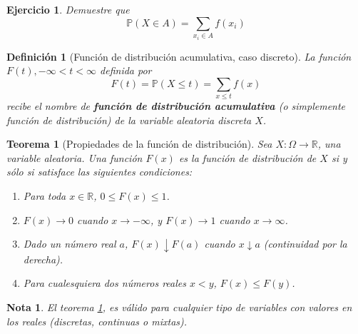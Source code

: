 \documentclass[11pt]{report}
\theoremstyle{break}
\newtheorem{definicion}{Definición}[chapter]
\newtheorem{teorema}{Teorema}[chapter]
\newtheorem{nota}{Nota}[chapter]
\newtheorem{ejercicio}{Ejercicio}[chapter]
\theoremstyle{break}
\begin{document}
\begin{ejercicio}
Demuestre que 
$$
\mathbb{P}(X \in A) = \sum_{x_i \in A}f(x_i)
$$
\end{ejercicio}

\begin{definicion}[Función de distribución acumulativa, caso discreto]
\label{definicion:funcion de distribucion caso discreto}
La función $F(t), -\infty < t < \infty$ definida por
$$
F(t) = \mathbb{P}(X \leq t) = \sum_{x \leq t} f(x)
$$
recibe el nombre de \textbf{función de distribución acumulativa} (o simplemente función de distribución) de la variable aleatoria discreta $X$.
\end{definicion}

\begin{teorema}[Propiedades de la función de distribución]
\label{teorema: propiedades de la funcion de distribucion}
Sea $X:\Omega \rightarrow \mathbb{R}$, una variable aleatoria. Una función $F(x)$ es la función de distribución de $X$ si y sólo si satisface las siguientes condiciones:
\begin{enumerate}[label=\alph*)]
\item Para toda $x \in \mathbb{R}$, $0 \leq F(x) \leq 1$.
\item $F(x) \rightarrow 0$ cuando $x \rightarrow -\infty$, y  $F(x) \rightarrow 1$ cuando $x \rightarrow \infty$.
\item Dado un número real $a$, $F(x) \downarrow F(a)$ cuando $x \downarrow a$ (continuidad por la derecha).
\item Para cualesquiera dos números reales $x < y$, $F(x) \leq F(y)$.
\end{enumerate}
\end{teorema}
\begin{nota}
El teorema \ref{teorema: propiedades de la funcion de distribucion}, es válido para cualquier tipo de variables con valores en los reales (discretas, continuas o mixtas).
\end{nota}
\end{document}
